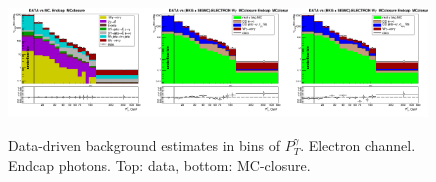 \begin{figure}[htb]
\begin{center}
   \includegraphics[width=0.33\textwidth]{../figs/figs_v11/ELECTRON_WGamma/PrepareYields/c_TotalDATAvsMC_Endcap__phoEt_MCclosure.png}\includegraphics[width=0.33\textwidth]{../figs/figs_v11/ELECTRON_WGamma/PrepareYields/c_DATAvsBkgPlusSigMCc_ELECTRON_WGamma_TEMPL_CHISO_UNblind_MCclosure__Endcap__phoEt_MCclosure.png}\includegraphics[width=0.33\textwidth]{../figs/figs_v11/ELECTRON_WGamma/PrepareYields/c_DATAvsBkgPlusSigMCc_ELECTRON_WGamma_TEMPL_SIHIH_UNblind_MCclosure__Endcap__phoEt_MCclosure.png}
  \caption{Data-driven background estimates in bins of $P_T^{\gamma}$. Electron channel. Endcap photons. Top: data, bottom: MC-closure.}
  \end{center}
\end{figure}
